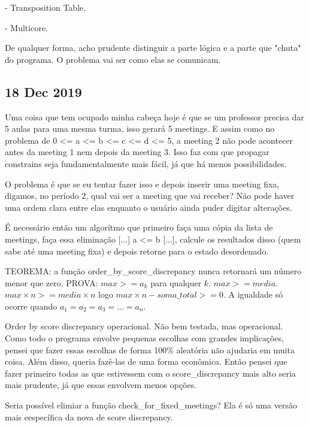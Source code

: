 \documentclass{article}
\begin{document}
- Transposition Table.

- Multicore.

De qualquer forma, acho prudente distinguir a parte lógica e a parte que
"chuta" do programa. O problema vai ser como elas se comunicam.

\subsection{18 Dec 2019}

\par Uma coisa que tem ocupado minha cabeça hoje é que se um professor
precisa dar 5 aulas para uma mesma turma, isso gerará 5 meetings. E assim
como no problema de 0 <= a <= b <= c <= d <= 5,  a meeting 2 não pode acontecer
antes da meeting 1 nem depois da meeting 3. Isso faz com que propagar
constrains seja fundamentalmente mais fácil, já que há menos possibilidades.

\par O problema é que se eu tentar fazer isso e depois inserir uma meeting
fixa, digamos, no período 2, qual vai ser a meeting que vai receber? Não
pode haver uma ordem clara entre elas enquanto o usuário ainda puder digitar
alterações.

\par É necessário então um algorítmo que primeiro faça uma cópia da lista de
meetings, faça essa eliminação [...] a <= b [...], calcule os resultados disso
(quem sabe até uma meeting fixa) e depois retorne para o estado desordenado.

\par TEOREMA: a função order\_by\_score\_discrepancy nunca retornará um número
menor que zero. PROVA: $max >= a_k$ para qualquer $k$. $max >= media$. $max \times n >= media \times n$
logo $max \times n - soma\_total >= 0$. A igualdade só ocorre quando $a_1 = a_2 = a_3 = ...=  a_n$.

\par Order by score discrepancy operacional. Não bem testada, mas operacional.
Como todo o programa envolve pequenas escolhas com grandes implicações, pensei
que fazer essas escolhas de forma 100\% aleatória não ajudaria em muita coisa.
Além disso, queria fazê-las de uma forma econômica. Então pensei que fazer
primeiro todas as que estivessem com o score\_discrepancy mais alto seria mais
prudente, já que essas envolvem menos opções.

\par Seria possível elimiar a função check\_for\_fixed\_meetings? Ela é só uma
versão mais eespecífica da nova de score discrepancy.
\end{document}
